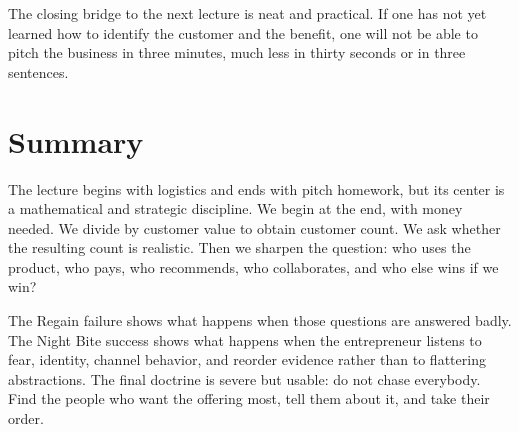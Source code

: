 The closing bridge to the next lecture is neat and practical. If one has not yet learned how to identify the customer and the benefit, one will not be able to pitch the business in three minutes, much less in thirty seconds or in three sentences.

\section{Summary}

The lecture begins with logistics and ends with pitch homework, but its center is a mathematical and strategic discipline. We begin at the end, with money needed. We divide by customer value to obtain customer count. We ask whether the resulting count is realistic. Then we sharpen the question: who uses the product, who pays, who recommends, who collaborates, and who else wins if we win?

The Regain failure shows what happens when those questions are answered badly. The Night Bite success shows what happens when the entrepreneur listens to fear, identity, channel behavior, and reorder evidence rather than to flattering abstractions. The final doctrine is severe but usable: do not chase everybody. Find the people who want the offering most, tell them about it, and take their order.